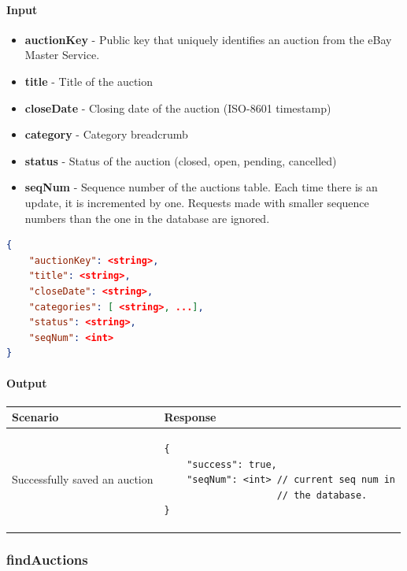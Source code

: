 \documentclass[12pt,a4paper]{article}
\begin{document}
\paragraph{Input}

\begin{itemize}
    \item \textbf{auctionKey} - Public key that uniquely identifies an auction from the eBay Master Service.
    \item \textbf{title} - Title of the auction 
    \item \textbf{closeDate} - Closing date of the auction (ISO-8601 timestamp)
    \item \textbf{category} - Category breadcrumb
    \item \textbf{status} - Status of the auction (closed, open, pending, cancelled)
    \item \textbf{seqNum} - Sequence number of the auctions table. Each time
        there is an update, it is incremented by one. Requests made with
        smaller sequence numbers than the one in the database are ignored.
\end{itemize}
\begin{lstlisting}[language=json,numbers=none]
{
    "auctionKey": <string>,
    "title": <string>,
    "closeDate": <string>,
    "categories": [ <string>, ...],
    "status": <string>,
    "seqNum": <int>
}
\end{lstlisting}

\paragraph{Output}
\begin{center}
    \begin{tabular}{| p{5cm} | l |}
        \hline
        \textbf{Scenario} & \textbf{Response} \\
        \hline
        Successfully saved an auction & 
        \begin{lstlisting}[language=tableJson,firstnumber=1]
{
    "success": true,
    "seqNum": <int> // current seq num in
                    // the database.
}

        \end{lstlisting} \\ 
        \hline
    \end{tabular}
\end{center}



\pagebreak
\subsubsection{findAuctions}
\end{document}

